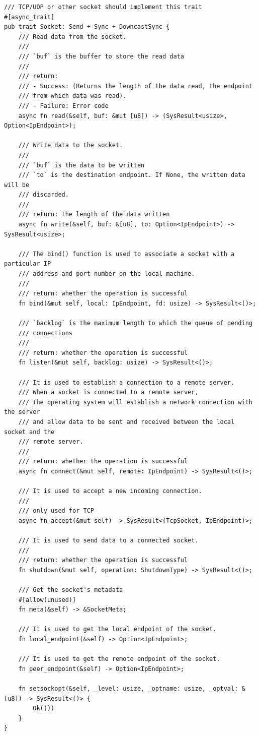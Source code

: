 \documentclass{article}
\begin{document}
\begin{lstlisting}
/// TCP/UDP or other socket should implement this trait
#[async_trait]
pub trait Socket: Send + Sync + DowncastSync {
    /// Read data from the socket.
    ///
    /// `buf` is the buffer to store the read data
    ///
    /// return:
    /// - Success: (Returns the length of the data read, the endpoint
    /// from which data was read).
    /// - Failure: Error code
    async fn read(&self, buf: &mut [u8]) -> (SysResult<usize>, Option<IpEndpoint>);

    /// Write data to the socket.
    ///
    /// `buf` is the data to be written  
    /// `to` is the destination endpoint. If None, the written data will be
    /// discarded.
    ///
    /// return: the length of the data written
    async fn write(&self, buf: &[u8], to: Option<IpEndpoint>) -> SysResult<usize>;

    /// The bind() function is used to associate a socket with a particular IP
    /// address and port number on the local machine.
    ///
    /// return: whether the operation is successful
    fn bind(&mut self, local: IpEndpoint, fd: usize) -> SysResult<()>;

    /// `backlog` is the maximum length to which the queue of pending
    /// connections
    ///
    /// return: whether the operation is successful
    fn listen(&mut self, backlog: usize) -> SysResult<()>;

    /// It is used to establish a connection to a remote server.
    /// When a socket is connected to a remote server,
    /// the operating system will establish a network connection with the server
    /// and allow data to be sent and received between the local socket and the
    /// remote server.
    ///
    /// return: whether the operation is successful
    async fn connect(&mut self, remote: IpEndpoint) -> SysResult<()>;

    /// It is used to accept a new incoming connection.
    ///
    /// only used for TCP
    async fn accept(&mut self) -> SysResult<(TcpSocket, IpEndpoint)>;

    /// It is used to send data to a connected socket.
    ///
    /// return: whether the operation is successful
    fn shutdown(&mut self, operation: ShutdownType) -> SysResult<()>;

    /// Get the socket's metadata
    #[allow(unused)]
    fn meta(&self) -> &SocketMeta;

    /// It is used to get the local endpoint of the socket.
    fn local_endpoint(&self) -> Option<IpEndpoint>;

    /// It is used to get the remote endpoint of the socket.
    fn peer_endpoint(&self) -> Option<IpEndpoint>;

    fn setsockopt(&self, _level: usize, _optname: usize, _optval: &[u8]) -> SysResult<()> {
        Ok(())
    }
}
\end{lstlisting}
\end{document}
